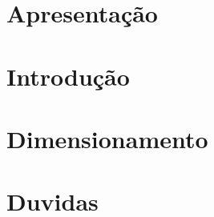 






\section{Apresentação}



\section{Introdução}



\section{Dimensionamento}



\section*{Duvidas}



